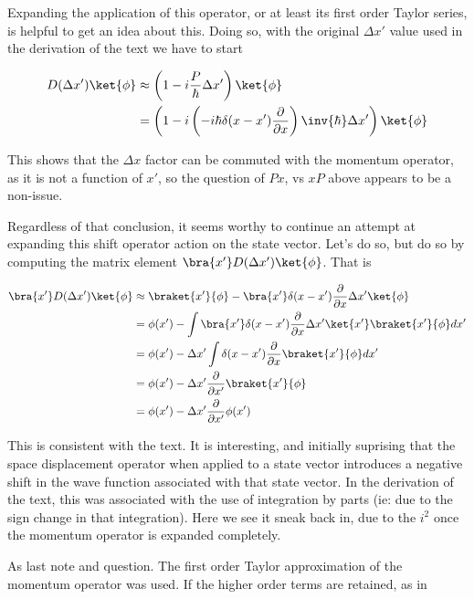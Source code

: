 Expanding the application of this operator, or at least its first order Taylor series, is helpful to get an idea about this.  Doing so, with the original $\Delta x'$ value used in the derivation of the text we have to start

\begin{align*}
D(\Delta x') \ket{\phi} 
&\approx \left(1 - i \frac{P}{\hbar} \Delta x' \right) \ket{\phi} \\
&= \left(1 - i \left( -i \hbar \delta(x -x') \frac{\partial}{\partial x} \right) \inv{\hbar} \Delta x'\right) \ket{\phi} \\
\end{align*}

This shows that the $\Delta x$ factor can be commuted with the momentum operator, as it is not a function of $x'$, so the question of $P x$, vs $x P$ above appears to be a non-issue.

Regardless of that conclusion, it seems worthy to continue an attempt at expanding this shift operator action on the state vector.  Let's do so, but do so by computing the matrix element $\bra{x'} D(\Delta x') \ket{\phi}$.  That is

\begin{align*}
\bra{x'} D(\Delta x') \ket{\phi} 
&\approx
\braket{x'}{\phi} - \bra{x'} \delta(x -x') \frac{\partial}{\partial x} \Delta x' \ket{\phi} \\
&=
\phi(x') - \int \bra{x'} \delta(x -x') \frac{\partial}{\partial x} \Delta x' \ket{x'} \braket{x'}{\phi} dx' \\
&=
\phi(x') - \Delta x' \int \delta(x -x') \frac{\partial}{\partial x} \braket{x'}{\phi} dx' \\
&=
\phi(x') - \Delta x' \frac{\partial}{\partial x'} \braket{x'}{\phi} \\
&=
\phi(x') - \Delta x' \frac{\partial}{\partial x'} \phi(x') \\
\end{align*}

This is consistent with the text.  It is interesting, and initially suprising that the space displacement operator when applied to a state vector introduces a negative shift in the wave function associated with that state vector.  In the derivation of the text, this was associated with the use of integration by parts (ie: due to the sign change in that integration).  Here we see it sneak back in, due to the $i^2$ once the momentum operator is expanded completely.

As last note and question.  The first order Taylor approximation of the momentum operator was used.  If the higher order terms are retained, as in

